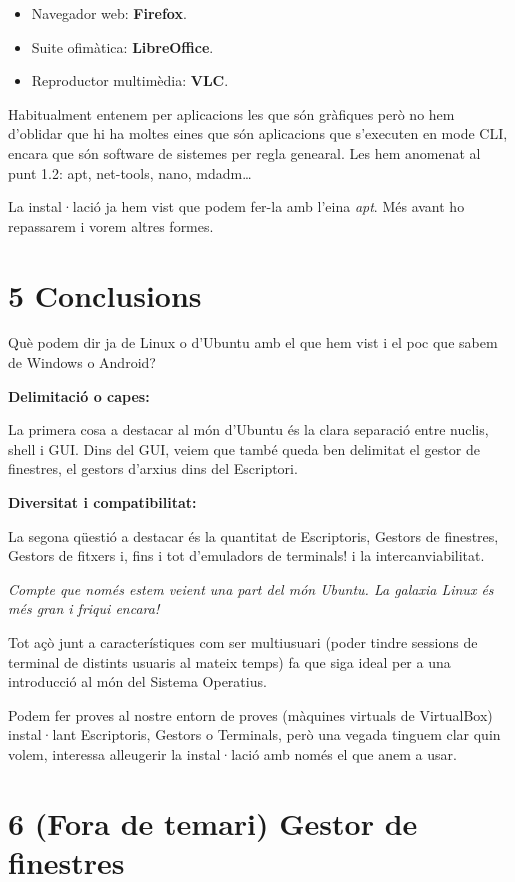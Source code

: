 \documentclass[
  a4paper,
]{article}
\providecommand{\tightlist}{%
  \setlength{\itemsep}{0pt}\setlength{\parskip}{0pt}}
\begin{document}
\begin{itemize}
\tightlist
\item
  Navegador web: \textbf{Firefox}.
\item
  Suite ofimàtica: \textbf{LibreOffice}.
\item
  Reproductor multimèdia: \textbf{VLC}.
\end{itemize}

Habitualment entenem per aplicacions les que són gràfiques però no hem
d'oblidar que hi ha moltes eines que són aplicacions que s'executen en
mode CLI, encara que són software de sistemes per regla genearal. Les
hem anomenat al punt 1.2: apt, net-tools, nano, mdadm\ldots{}

La instal·lació ja hem vist que podem fer-la amb l'eina \emph{apt}. Més
avant ho repassarem i vorem altres formes.

\section{5 Conclusions}\label{conclusions}

Què podem dir ja de Linux o d'Ubuntu amb el que hem vist i el poc que
sabem de Windows o Android?

\textbf{Delimitació o capes:}

La primera cosa a destacar al món d'Ubuntu és la clara separació entre
nuclis, shell i GUI. Dins del GUI, veiem que també queda ben delimitat
el gestor de finestres, el gestors d'arxius dins del Escriptori.

\textbf{Diversitat i compatibilitat:}

La segona qüestió a destacar és la quantitat de Escriptoris, Gestors de
finestres, Gestors de fitxers i, fins i tot d'emuladors de terminals! i
la intercanviabilitat.

\emph{Compte que només estem veient una part del món Ubuntu. La galaxia
Linux és més gran i friqui encara!}

Tot açò junt a característiques com ser multiusuari (poder tindre
sessions de terminal de distints usuaris al mateix temps) fa que siga
ideal per a una introducció al món del Sistema Operatius.

Podem fer proves al nostre entorn de proves (màquines virtuals de
VirtualBox) instal·lant Escriptoris, Gestors o Terminals, però una
vegada tinguem clar quin volem, interessa alleugerir la instal·lació amb
només el que anem a usar.

\section{6 (Fora de temari) Gestor de
finestres}\label{fora-de-temari-gestor-de-finestres}
\end{document}
